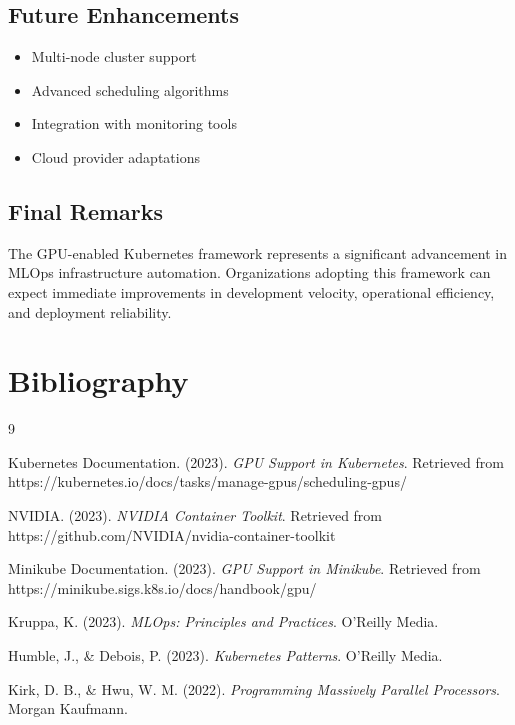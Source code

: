 \documentclass[12pt,a4paper]{report}
\begin{document}
\section{Future Enhancements}
\begin{itemize}
    \item Multi-node cluster support
    \item Advanced scheduling algorithms
    \item Integration with monitoring tools
    \item Cloud provider adaptations
\end{itemize}

\section{Final Remarks}
The GPU-enabled Kubernetes framework represents a significant advancement in MLOps infrastructure automation. Organizations adopting this framework can expect immediate improvements in development velocity, operational efficiency, and deployment reliability.

\chapter{Bibliography}
\label{chap:bibliography}

\begin{thebibliography}{9}

Kubernetes Documentation. (2023). \textit{GPU Support in Kubernetes}. Retrieved from https://kubernetes.io/docs/tasks/manage-gpus/scheduling-gpus/

NVIDIA. (2023). \textit{NVIDIA Container Toolkit}. Retrieved from https://github.com/NVIDIA/nvidia-container-toolkit

Minikube Documentation. (2023). \textit{GPU Support in Minikube}. Retrieved from https://minikube.sigs.k8s.io/docs/handbook/gpu/

Kruppa, K. (2023). \textit{MLOps: Principles and Practices}. O'Reilly Media.

Humble, J., \& Debois, P. (2023). \textit{Kubernetes Patterns}. O'Reilly Media.

Kirk, D. B., \& Hwu, W. M. (2022). \textit{Programming Massively Parallel Processors}. Morgan Kaufmann.

\end{thebibliography}
\end{document}
